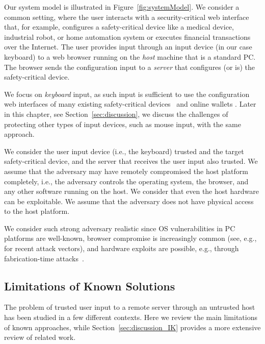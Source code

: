 Our system model is illustrated in Figure~\ref{fig:systemModel}. We consider a common setting, where the user interacts with a security-critical web interface that, for example, configures a safety-critical device like a medical device, industrial robot, or home automation system or executes financial transactions over the Internet. The user provides input through an input device (in our case keyboard) to a web browser running on the \emph{host} machine that is a standard PC. The browser sends the configuration input to a \emph{server} that configures (or is) the safety-critical device.

We focus on \emph{keyboard} input, as such input is sufficient to use the configuration web interfaces of many existing safety-critical devices~\cite{7306669,controlbyweb,siemens,siemens2,schneider} and online wallets \cite{bitgo,bitcoinwallet,coin,blockchain,coinbase}. Later in this chapter, see Section~\ref{sec:discussion}, we discuss the challenges of protecting other types of input devices, such as mouse input, with the same approach.

 We consider the user input device (i.e., the keyboard) trusted and the target safety-critical device, and the server that receives the user input also trusted. We assume that the adversary may have remotely compromised the host platform completely, i.e., the adversary controls the operating system, the browser, and any other software running on the host. We consider that even the host hardware can be exploitable. We assume that the adversary does not have physical access to the host platform.

We consider such strong adversary realistic since OS vulnerabilities in PC platforms are well-known, browser compromise is increasingly common (see, e.g.,~\cite{provos2007ghost,dougan2012man} for recent attack vectors), and hardware exploits are possible, e.g., through fabrication-time attacks~\cite{Lin2009,a2}. 

\subsection{Limitations of Known Solutions}

The problem of trusted user input to a remote server through an untrusted host has been studied in a few different contexts. Here we review the main limitations of known approaches, while Section~\ref{sec:discussion_IK} provides a more extensive review of related work.

